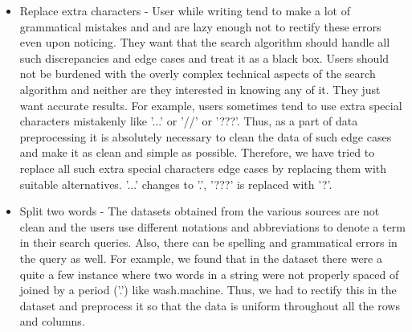 \documentclass{sig-alternate-05-2015}
\begin{document}
\begin{itemize}
    \item Replace extra characters - User while writing tend to make a lot of grammatical mistakes and and are lazy enough not to rectify these errors even upon noticing. They want that the search algorithm should handle all such discrepancies and edge cases and treat it as a black box. Users should not be burdened with the overly complex technical aspects of the search algorithm and neither are they interested in knowing any of it. They just want accurate results. For example, users sometimes tend to use extra special characters mistakenly like '...' or '//' or '???'. Thus, as a part of data preprocessing it is absolutely necessary to clean the data of such edge cases and make it as clean and simple as possible. Therefore, we have tried to replace all such extra special characters edge cases by replacing them with suitable alternatives. '...' changes to '.', '???' is replaced with '?'.  
    
    \item Split two words - The datasets obtained from the various sources are not clean and the users use different notations and abbreviations to denote a term in their search queries. Also, there can be spelling and grammatical errors in the query as well. For example, we found that in the dataset there were a quite a few instance where two words in a string were not properly spaced of joined by a period ('.') like wash.machine. Thus, we had to rectify this in the dataset and preprocess it so that the data is uniform throughout all the rows and columns. \\ 

\end{itemize}
\end{document}
